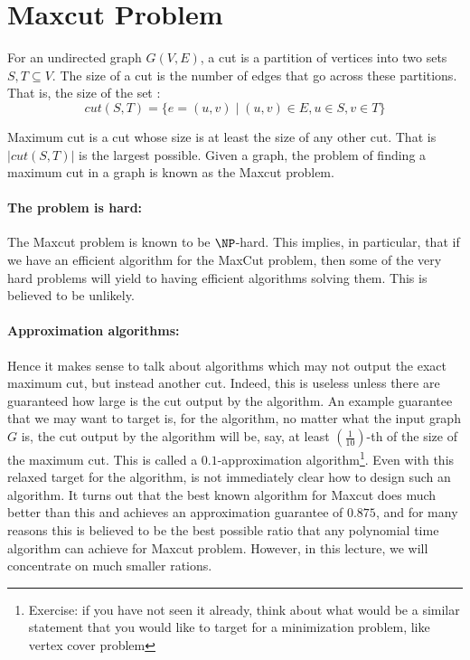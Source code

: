 

\section{{\sc Maxcut} Problem}

For an undirected graph $G(V,E)$, a cut is a partition of vertices into two sets $S,T \subseteq V$. The size of a cut is the number of edges that go across these partitions. That is, the size of the set :
$$cut(S,T) = \{ e=(u,v) \mid (u,v) \in E, u \in S, v \in T \}$$

Maximum cut is a cut whose size is at least the size of any other cut. That is $|cut(S,T)|$ is the largest possible. Given a graph, the problem of finding a maximum cut in a graph is known as the {\sc Maxcut} problem.

\paragraph*{The problem is hard:} The {\sc Maxcut} problem is known to be $\NP$-hard. This implies, in particular, that if we have an efficient algorithm for the {\sc MaxCut} problem, then some of the very hard problems will yield to having efficient algorithms solving them. This is believed to be unlikely. \\[-9mm]

\paragraph*{Approximation algorithms: }Hence it makes sense to talk about algorithms which may not output the exact maximum cut, but instead another cut. Indeed, this is useless unless there are guaranteed how large is the cut output by the algorithm. An example guarantee that we may want to target is, for the algorithm, no matter what the input graph $G$ is, the cut output by the algorithm will be, say, at least $\left(\frac{1}{10}\right)$-th of the size of the maximum cut. This is called a $0.1$-approximation algorithm\footnote{Exercise: if you have not seen it already, think about what would be a similar statement that you would like to target for a minimization problem, like vertex cover problem}. Even with this relaxed target for the algorithm, is not immediately clear how to design such an algorithm. It turns out that the best known algorithm for {\sc Maxcut} does much better than this and achieves an approximation guarantee of $0.875$, and for many reasons this is believed to be the best possible ratio that any polynomial time algorithm can achieve for {\sc Maxcut} problem. However, in this lecture, we will concentrate on much smaller rations. \\[-9mm]

